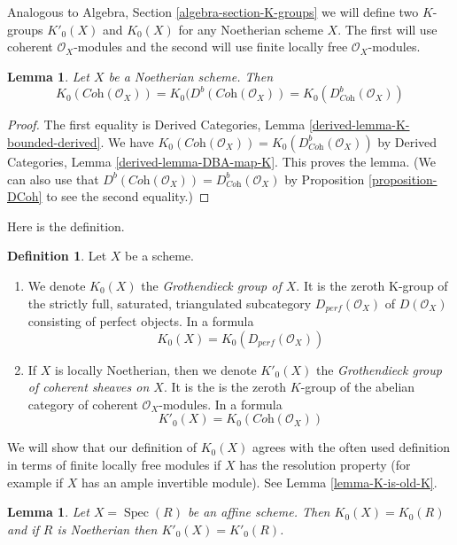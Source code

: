 \documentclass{stacks-project}
\theoremstyle{plain}
\newtheorem{lemma}[subsection]{Lemma}
\theoremstyle{definition}
\newtheorem{definition}[subsection]{Definition}
\theoremstyle{remark}
\numberwithin{equation}{subsection}
\def\Spec{\mathop{\mathrm{Spec}}}
\begin{document}
\medskip\noindent
Analogous to Algebra, Section \ref{algebra-section-K-groups}
we will define two $K$-groups $K'_0(X)$ and $K_0(X)$ for any
Noetherian scheme $X$. The first will use coherent $\mathcal{O}_X$-modules
and the second will use finite locally free $\mathcal{O}_X$-modules.

\begin{lemma}
\label{lemma-Noetherian-Kprime}
Let $X$ be a Noetherian scheme. Then
$$
K_0(\textit{Coh}(\mathcal{O}_X)) =
K_0(D^b(\textit{Coh}(\mathcal{O}_X)) =
K_0(D^b_{\textit{Coh}}(\mathcal{O}_X))
$$
\end{lemma}

\begin{proof}
The first equality is
Derived Categories, Lemma \ref{derived-lemma-K-bounded-derived}.
We have $K_0(\textit{Coh}(\mathcal{O}_X)) =
K_0(D^b_{\textit{Coh}}(\mathcal{O}_X))$ by
Derived Categories, Lemma \ref{derived-lemma-DBA-map-K}.
This proves the lemma.
(We can also use that
$D^b(\textit{Coh}(\mathcal{O}_X)) = D^b_{\textit{Coh}}(\mathcal{O}_X)$
by Proposition \ref{proposition-DCoh} to see the second
equality.)
\end{proof}

\noindent
Here is the definition.

\begin{definition}
\label{definition-K-group}
Let $X$ be a scheme.
\begin{enumerate}
\item We denote $K_0(X)$ the {\it Grothendieck group of $X$}. It is the
zeroth K-group of the strictly full, saturated, triangulated subcategory
$D_{perf}(\mathcal{O}_X)$ of $D(\mathcal{O}_X)$ consisting of perfect objects.
In a formula
$$
K_0(X) = K_0(D_{perf}(\mathcal{O}_X))
$$
\item If $X$ is locally Noetherian, then we denote $K'_0(X)$ the
{\it Grothendieck group of coherent sheaves on $X$}. It is the
is the zeroth $K$-group of the abelian category
of coherent $\mathcal{O}_X$-modules. In a formula
$$
K'_0(X) = K_0(\textit{Coh}(\mathcal{O}_X))
$$
\end{enumerate}
\end{definition}

\noindent
We will show that our definition of $K_0(X)$ agrees with the often used
definition in terms of finite locally free modules if $X$ has the
resolution property (for example if $X$ has an ample invertible module).
See Lemma \ref{lemma-K-is-old-K}.

\begin{lemma}
\label{lemma-K-agrees-affine}
Let $X = \Spec(R)$ be an affine scheme. Then $K_0(X) = K_0(R)$
and if $R$ is Noetherian then $K'_0(X) = K'_0(R)$.
\end{lemma}
\end{document}
